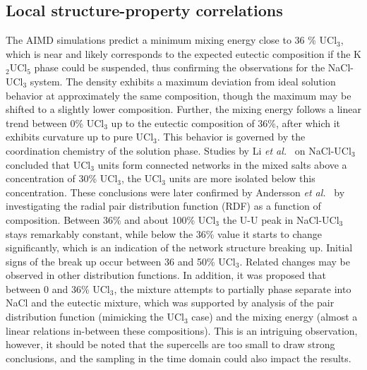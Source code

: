 \documentclass[preprint,3p,10pt,twocolumn,number,sort&compress]{elsarticle}
\begin{document}

\subsection{Local structure-property correlations}
The AIMD simulations predict a minimum mixing energy close to 36 \% UCl$_3$, which is near and likely corresponds to the expected eutectic composition if the K$_2$UCl$_5$ phase could be suspended, thus confirming the observations for the NaCl-UCl$_3$ system. The density exhibits a maximum deviation from ideal solution behavior at approximately the same composition, though the maximum may be shifted to a slightly lower composition. Further, the mixing energy follows a linear trend between 0\% UCl$_3$ up to the eutectic composition of 36\%, after which it exhibits curvature up to pure UCl$_3$. This behavior is governed by the coordination chemistry of the solution phase. Studies by Li \textit{et al.}~\cite{Li} on NaCl-UCl$_3$ concluded that UCl$_3$ units form connected networks in the mixed salts above a concentration of 30\% UCl$_3$, the UCl$_3$ units are more isolated below this concentration. These conclusions were later confirmed by Andersson \textit{et al.}~\cite{Andersson} by investigating the radial pair distribution function (RDF) as a function of composition. Between 36\% and about 100\% UCl$_3$ the U-U peak in NaCl-UCl$_3$ stays remarkably constant, while below the 36\% value it starts to change significantly, which is an indication of the network structure breaking up. Initial signs of the break up occur between 36 and 50\% UCl$_3$. Related changes may be observed in other distribution functions. In addition, it was proposed that between 0 and 36\% UCl$_3$, the mixture attempts to partially phase separate into NaCl and the eutectic mixture, which was supported by analysis of the pair distribution function (mimicking the UCl$_3$ case) and the mixing energy (almost a linear relations in-between these compositions). This is an intriguing observation, however, it should be noted that the supercells are too small to draw strong conclusions, and the sampling in the time domain could also impact the results. 
\end{document}
